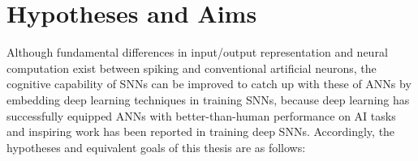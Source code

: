 \section{Hypotheses and Aims}
\label{sec:aim}


Although fundamental differences in input/output representation and neural computation exist between spiking and conventional artificial neurons, the cognitive capability of SNNs can be improved to catch up with these of ANNs by embedding deep learning techniques in training SNNs, because deep learning has successfully equipped ANNs with better-than-human performance on AI tasks and inspiring work has been reported in training deep SNNs.
Accordingly, the hypotheses and equivalent goals of this thesis are as follows: 
